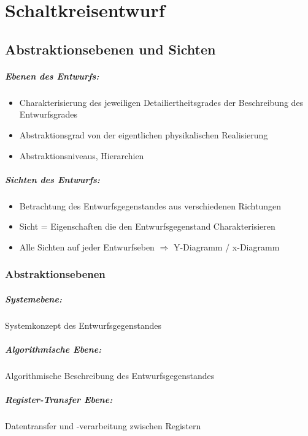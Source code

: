 \chapter{Schaltkreisentwurf}

\section{Abstraktionsebenen und Sichten}
	\paragraph{Ebenen des Entwurfs:}
	\begin{itemize}
		\item Charakterisierung des jeweiligen Detailiertheitsgrades der Beschreibung des Entwurfsgrades
		\item Abstraktionsgrad von der eigentlichen physikalischen Realisierung
		\item Abstraktionsniveaus, Hierarchien
	\end{itemize}

	\paragraph{Sichten des Entwurfs:}
	\begin{itemize}
		\item Betrachtung des Entwurfsgegenstandes aus verschiedenen Richtungen
		\item Sicht = Eigenschaften die den Entwurfsgegenstand Charakterisieren
		\item Alle Sichten auf jeder Entwurfseben $\Rightarrow$ Y-Diagramm / x-Diagramm
	\end{itemize}

\subsection{Abstraktionsebenen}
	\paragraph{Systemebene:} Systemkonzept des Entwurfsgegenstandes
	\paragraph{Algorithmische Ebene:} Algorithmische Beschreibung des Entwurfsgegenstandes
	\paragraph{Register-Transfer Ebene:} Datentransfer und -verarbeitung zwischen Registern
